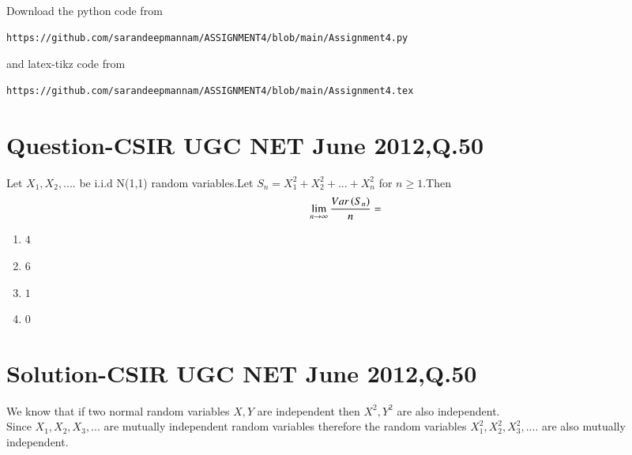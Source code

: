 \documentclass[journal,12pt,twocolumn]{IEEEtran}
\begin{document}
Download the python code from 
\begin{lstlisting}
https://github.com/sarandeepmannam/ASSIGNMENT4/blob/main/Assignment4.py
\end{lstlisting}
%
and latex-tikz code from 
%
\begin{lstlisting}
https://github.com/sarandeepmannam/ASSIGNMENT4/blob/main/Assignment4.tex
\end{lstlisting}
\section{Question-CSIR UGC NET June 2012,Q.50}
Let $X_{1},X_{2},....$ be i.i.d N(1,1) random variables.Let $S_{n}=X_{1}^{2}+X_{2}^2+...+X_{n}^{2}$ for $n\ge1$.Then $$\lim_{n \to \infty}{\frac{Var\left(S_{n}\right)}{n}}=$$
\begin{enumerate}[label = (\Alph*)]
\item  $4$
\item  $6$
\item  $1$
\item  $0$
\end{enumerate}

\section{Solution-CSIR UGC NET June 2012,Q.50}
We know that if two normal random variables $X,Y$ are independent then $X^2,Y^2$ are also independent.
\\Since $X_{1},X_{2},X_{3},...$ are mutually independent random variables therefore the random variables $X_{1}^{2},X_{2}^{2},X_{3}^{2},....$  are also mutually independent.
\end{document}
